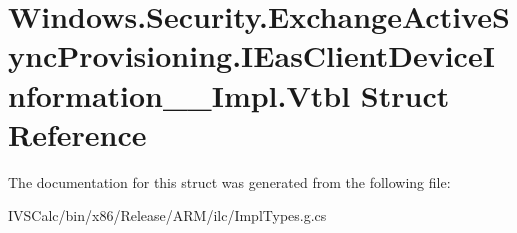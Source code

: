 \hypertarget{struct_windows_1_1_security_1_1_exchange_active_sync_provisioning_1_1_i_eas_client_device_information_____impl_1_1_vtbl}{}\section{Windows.\+Security.\+Exchange\+Active\+Sync\+Provisioning.\+I\+Eas\+Client\+Device\+Information\+\_\+\+\_\+\+Impl.\+Vtbl Struct Reference}
\label{struct_windows_1_1_security_1_1_exchange_active_sync_provisioning_1_1_i_eas_client_device_information_____impl_1_1_vtbl}


The documentation for this struct was generated from the following file\+:\begin{DoxyCompactItemize}
\item 
I\+V\+S\+Calc/bin/x86/\+Release/\+A\+R\+M/ilc/Impl\+Types.\+g.\+cs\end{DoxyCompactItemize}
